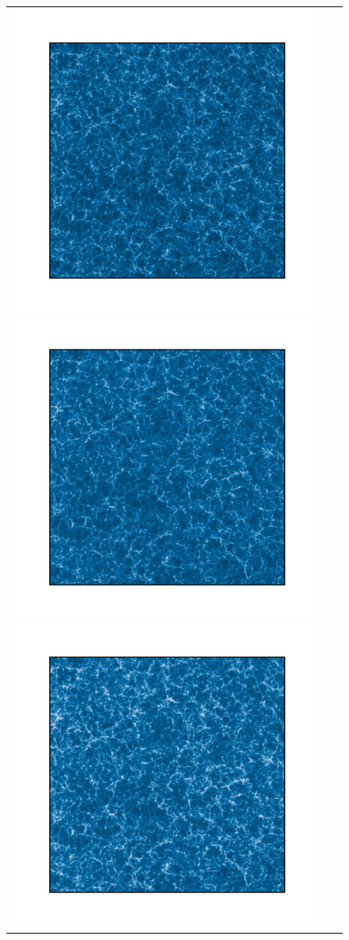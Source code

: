 \documentclass[english,usenatbib]{mn2e}
\begin{document}
\begin{figure}
 \begin{tabular}{ccc}
\includegraphics[width=0.6\columnwidth]{bigmd_large}
\includegraphics[width=0.6\columnwidth]{fastpm_large}
\includegraphics[width=0.6\columnwidth]{alpt_large}\\

\end{tabular}
\end{figure}
\end{document}
